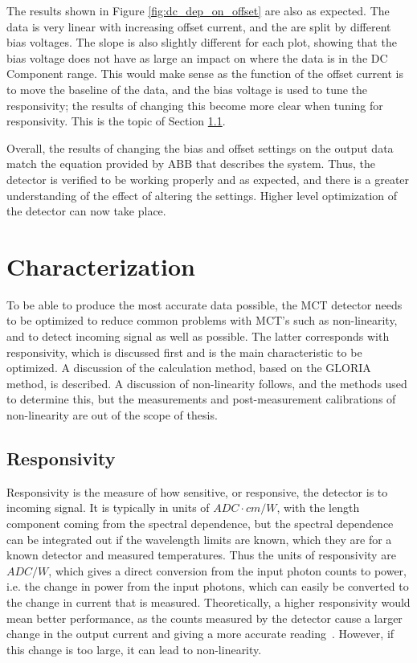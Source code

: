 The results shown in Figure \ref{fig:dc_dep_on_offset} are also as expected. The data is very linear with increasing offset current, and the are split by different bias voltages. The slope is also slightly different for each plot, showing that the bias voltage does not have as large an impact on where the data is in the DC Component range. This would make sense as the function of the offset current is to move the baseline of the data, and the bias voltage is used to tune the responsivity; the results of changing this become more clear when tuning for responsivity. This is the topic of Section \ref{responsivity_sec}.

Overall, the results of changing the bias and offset settings on the output data match the equation provided by ABB that describes the system. Thus, the detector is verified to be working properly and as expected, and there is a greater understanding of the effect of altering the settings. Higher level optimization of the detector can now take place.

\section{Characterization}\label{detector_char}
To be able to produce the most accurate data possible, the MCT detector needs to be optimized to reduce common problems with MCT's such as non-linearity, and to detect incoming signal as well as possible. The latter corresponds with responsivity, which is discussed first and is the main characteristic to be optimized. A discussion of the calculation method, based on the GLORIA method, is described. A discussion of non-linearity follows, and the methods used to determine this, but the measurements and post-measurement calibrations of non-linearity are out of the scope of thesis.

\subsection{Responsivity}\label{responsivity_sec}
Responsivity is the measure of how sensitive, or responsive, the detector is to incoming signal. It is typically in units of $ADC\cdot cm/W$, with the length component coming from the spectral dependence, but the spectral dependence can be integrated out if the wavelength limits are known, which they are for a known detector and measured temperatures. Thus the units of responsivity are $ADC/W$, which gives a direct conversion from the input photon counts to power, i.e. the change in power from the input photons, which can easily be converted to the change in current that is measured. Theoretically, a higher responsivity would mean better performance, as the counts measured by the detector cause a larger change in the output current and giving a more accurate reading~\citep{GLORIA_PhD}. However, if this change is too large, it can lead to non-linearity.

